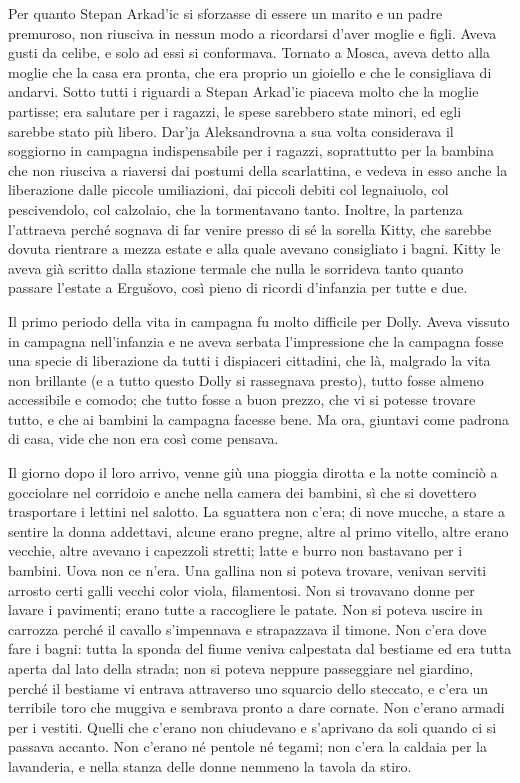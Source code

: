 Per quanto Stepan Arkad'ic si sforzasse di essere un marito e un padre premuroso, non riusciva in nessun modo a ricordarsi d'aver moglie e figli. Aveva gusti da celibe, e solo ad essi si conformava. Tornato a Mosca, aveva detto alla moglie che la casa era pronta, che era proprio un gioiello e che le consigliava di andarvi. Sotto tutti i riguardi a Stepan Arkad'ic piaceva molto che la moglie partisse; era salutare per i ragazzi, le spese sarebbero state minori, ed egli sarebbe stato più libero. Dar'ja Aleksandrovna a sua volta considerava il soggiorno in campagna indispensabile per i ragazzi, soprattutto per la bambina che non riusciva a riaversi dai postumi della scarlattina, e vedeva in esso anche la liberazione dalle piccole umiliazioni, dai piccoli debiti col legnaiuolo, col pescivendolo, col calzolaio, che la tormentavano tanto. Inoltre, la partenza l'attraeva perché sognava di far venire presso di sé la sorella Kitty, che sarebbe dovuta rientrare a mezza estate e alla quale avevano consigliato i bagni. Kitty le aveva già scritto dalla stazione termale che nulla le sorrideva tanto quanto passare l'estate a Ergušovo, così pieno di ricordi d'infanzia per tutte e due. 

Il primo periodo della vita in campagna fu molto difficile per Dolly. Aveva vissuto in campagna nell'infanzia e ne aveva serbata l'impressione che la campagna fosse una specie di liberazione da tutti i dispiaceri cittadini, che là, malgrado la vita non brillante (e a tutto questo Dolly si rassegnava presto), tutto fosse almeno accessibile e comodo; che tutto fosse a buon prezzo, che vi si potesse trovare tutto, e che ai bambini la campagna facesse bene. Ma ora, giuntavi come padrona di casa, vide che non era così come pensava. 

Il giorno dopo il loro arrivo, venne giù una pioggia dirotta e la notte cominciò a gocciolare nel corridoio e anche nella camera dei bambini, sì che si dovettero trasportare i lettini nel salotto. La sguattera non c'era; di nove mucche, a stare a sentire la donna addettavi, alcune erano pregne, altre al primo vitello, altre erano vecchie, altre avevano i capezzoli stretti; latte e burro non bastavano per i bambini. Uova non ce n'era. Una gallina non si poteva trovare, venivan serviti arrosto certi galli vecchi color viola, filamentosi. Non si trovavano donne per lavare i pavimenti; erano tutte a raccogliere le patate. Non si poteva uscire in carrozza perché il cavallo s'impennava e strapazzava il timone. Non c'era dove fare i bagni: tutta la sponda del fiume veniva calpestata dal bestiame ed era tutta aperta dal lato della strada; non si poteva neppure passeggiare nel giardino, perché il bestiame vi entrava attraverso uno squarcio dello steccato, e c'era un terribile toro che muggiva e sembrava pronto a dare cornate. Non c'erano armadi per i vestiti. Quelli che c'erano non chiudevano e s'aprivano da soli quando ci si passava accanto. Non c'erano né pentole né tegami; non c'era la caldaia per la lavanderia, e nella stanza delle donne nemmeno la tavola da stiro. 

